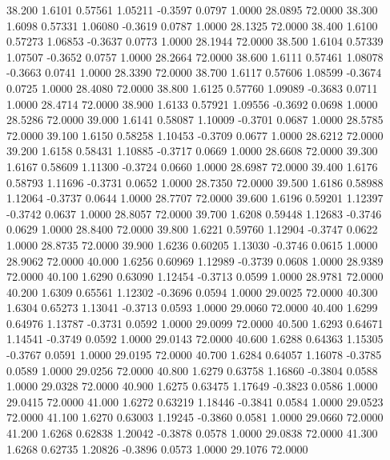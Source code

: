   38.200   1.6101   0.57561   1.05211  -0.3597   0.0797   1.0000  28.0895  72.0000
  38.300   1.6098   0.57331   1.06080  -0.3619   0.0787   1.0000  28.1325  72.0000
  38.400   1.6100   0.57273   1.06853  -0.3637   0.0773   1.0000  28.1944  72.0000
  38.500   1.6104   0.57339   1.07507  -0.3652   0.0757   1.0000  28.2664  72.0000
  38.600   1.6111   0.57461   1.08078  -0.3663   0.0741   1.0000  28.3390  72.0000
  38.700   1.6117   0.57606   1.08599  -0.3674   0.0725   1.0000  28.4080  72.0000
  38.800   1.6125   0.57760   1.09089  -0.3683   0.0711   1.0000  28.4714  72.0000
  38.900   1.6133   0.57921   1.09556  -0.3692   0.0698   1.0000  28.5286  72.0000
  39.000   1.6141   0.58087   1.10009  -0.3701   0.0687   1.0000  28.5785  72.0000
  39.100   1.6150   0.58258   1.10453  -0.3709   0.0677   1.0000  28.6212  72.0000
  39.200   1.6158   0.58431   1.10885  -0.3717   0.0669   1.0000  28.6608  72.0000
  39.300   1.6167   0.58609   1.11300  -0.3724   0.0660   1.0000  28.6987  72.0000
  39.400   1.6176   0.58793   1.11696  -0.3731   0.0652   1.0000  28.7350  72.0000
  39.500   1.6186   0.58988   1.12064  -0.3737   0.0644   1.0000  28.7707  72.0000
  39.600   1.6196   0.59201   1.12397  -0.3742   0.0637   1.0000  28.8057  72.0000
  39.700   1.6208   0.59448   1.12683  -0.3746   0.0629   1.0000  28.8400  72.0000
  39.800   1.6221   0.59760   1.12904  -0.3747   0.0622   1.0000  28.8735  72.0000
  39.900   1.6236   0.60205   1.13030  -0.3746   0.0615   1.0000  28.9062  72.0000
  40.000   1.6256   0.60969   1.12989  -0.3739   0.0608   1.0000  28.9389  72.0000
  40.100   1.6290   0.63090   1.12454  -0.3713   0.0599   1.0000  28.9781  72.0000
  40.200   1.6309   0.65561   1.12302  -0.3696   0.0594   1.0000  29.0025  72.0000
  40.300   1.6304   0.65273   1.13041  -0.3713   0.0593   1.0000  29.0060  72.0000
  40.400   1.6299   0.64976   1.13787  -0.3731   0.0592   1.0000  29.0099  72.0000
  40.500   1.6293   0.64671   1.14541  -0.3749   0.0592   1.0000  29.0143  72.0000
  40.600   1.6288   0.64363   1.15305  -0.3767   0.0591   1.0000  29.0195  72.0000
  40.700   1.6284   0.64057   1.16078  -0.3785   0.0589   1.0000  29.0256  72.0000
  40.800   1.6279   0.63758   1.16860  -0.3804   0.0588   1.0000  29.0328  72.0000
  40.900   1.6275   0.63475   1.17649  -0.3823   0.0586   1.0000  29.0415  72.0000
  41.000   1.6272   0.63219   1.18446  -0.3841   0.0584   1.0000  29.0523  72.0000
  41.100   1.6270   0.63003   1.19245  -0.3860   0.0581   1.0000  29.0660  72.0000
  41.200   1.6268   0.62838   1.20042  -0.3878   0.0578   1.0000  29.0838  72.0000
  41.300   1.6268   0.62735   1.20826  -0.3896   0.0573   1.0000  29.1076  72.0000
